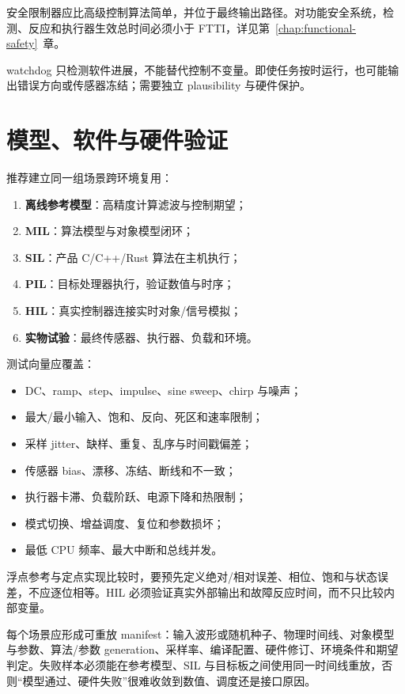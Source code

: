 安全限制器应比高级控制算法简单，并位于最终输出路径。对功能安全系统，检测、反应和执行器生效总时间必须小于 FTTI，详见第~\ref{chap:functional-safety}~章。

watchdog 只检测软件进展，不能替代控制不变量。即使任务按时运行，也可能输出错误方向或传感器冻结；需要独立 plausibility 与硬件保护。

\section{模型、软件与硬件验证}

推荐建立同一组场景跨环境复用：

\begin{enumerate}
  \item \textbf{离线参考模型}：高精度计算滤波与控制期望；
  \item \textbf{MIL}：算法模型与对象模型闭环；
  \item \textbf{SIL}：产品 C/C++/Rust 算法在主机执行；
  \item \textbf{PIL}：目标处理器执行，验证数值与时序；
  \item \textbf{HIL}：真实控制器连接实时对象/信号模拟；
  \item \textbf{实物试验}：最终传感器、执行器、负载和环境。
\end{enumerate}

测试向量应覆盖：

\begin{itemize}
  \item DC、ramp、step、impulse、sine sweep、chirp 与噪声；
  \item 最大/最小输入、饱和、反向、死区和速率限制；
  \item 采样 jitter、缺样、重复、乱序与时间戳偏差；
  \item 传感器 bias、漂移、冻结、断线和不一致；
  \item 执行器卡滞、负载阶跃、电源下降和热限制；
  \item 模式切换、增益调度、复位和参数损坏；
  \item 最低 CPU 频率、最大中断和总线并发。
\end{itemize}

浮点参考与定点实现比较时，要预先定义绝对/相对误差、相位、饱和与状态误差，不应逐位相等。HIL 必须验证真实外部输出和故障反应时间，而不只比较内部变量。

每个场景应形成可重放 manifest：输入波形或随机种子、物理时间线、对象模型与参数、算法/参数 generation、采样率、编译配置、硬件修订、环境条件和期望判定。失败样本必须能在参考模型、SIL 与目标板之间使用同一时间线重放，否则“模型通过、硬件失败”很难收敛到数值、调度还是接口原因。


